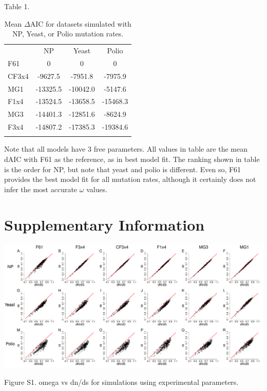 \documentclass{pnastwo}
\begin{document}
\noindent Table 1. 
\begin{table}[htbp]
	\caption {\label{tab:dAIC} Mean $\Delta$AIC for datasets simulated with NP, Yeast, or Polio mutation rates.}
	\begin{tabular}{l c c c}
		\hline\noalign{\smallskip}
		\multicolumn{1}{c}{Frequencies} & NP & Yeast & Polio \\
		\noalign{\smallskip}\hline\noalign{\smallskip}
		F61 & 0 & 0 & 0 \\ 
		CF3x4 & -9627.5 & -7951.8 & -7975.9 \\ 
		MG1 & -13325.5 & -10042.0 & -5147.6 \\ 
		F1x4 & -13524.5 & -13658.5 & -15468.3 \\ 
		MG3 & -14401.3 & -12851.6 & -8624.9 \\ 
		F3x4 & -14807.2 & -17385.3 & -19384.6 \\ 
		\noalign{\smallskip}\hline\noalign{\smallskip} 
	\end{tabular}
	Note that all models have 3 free parameters. All values in table are the mean dAIC with F61 as the reference, as in best model fit. The ranking shown in table is the order for NP, but note that yeast and polio is different. Even so, F61 provides the best model fit for all mutation rates, although it certainly does not infer the most accurate $\omega$ values.
\end{table}


\clearpage

	
\section{Supplementary Information}



\begin{landscape}
	\includegraphics[width=9.75in]{figures/SI/nyp_regression.pdf}
	\vspace{0.5cm}
	
	\hspace{1.2cm} Figure S1. omega vs dn/ds for simulations using experimental parameters.
\end{landscape}
\end{document}
